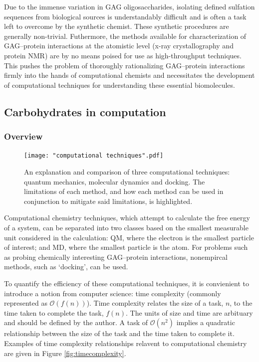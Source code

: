 \documentclass[journal=jctcce,manuscript=article]{achemso}
\begin{document}
{Due to the immense variation in \ac{GAG} oligosaccharides, isolating defined sulfation sequences from biological sources is understandably difficult and is often a task left to overcome by the synthetic chemist.  \cite{Gama2006SulfationActivity}
These synthetic procedures are generally non-trivial. \cite{Das2001SynthesisHeparin} 
Futhermore, the methods available for characterization of 
\ac{GAG}--protein interactions at the atomistic level (x-ray crystallography and protein NMR) are by no means poised for use as high-throughput techniques. This pushes the problem of thoroughly rationalizing \ac{GAG}--protein interactions firmly into the hands of computational chemists and necessitates the development of computational techniques for understanding these essential biomolecules. \cite{Woods2018PredictingComplexes}

%
%
%
%
%

\subsection{Carbohydrates in computation}
\subsubsection{Overview}

\begin{figure}[bl!]
    \centering
    \texttt{[image: "computational techniques".pdf]}
    \caption{An explanation and comparison of three computational techniques: quantum mechanics, molecular dynamics and docking. The limitations of each method, and how each method can be used in conjunction to mitigate said limitations, is highlighted.}
    \label{fig:comp}
\end{figure}

Computational chemistry techniques, which attempt to calculate the free energy of a system, can be separated into two classes based on the smallest measurable unit considered in the calculation: \ac{QM}, where the electron is the smallest particle of interest; and \acf{MD}, where the smallest particle is the atom. \cite{}
For problems such as probing chemically interesting \ac{GAG}--protein interactions, nonempircal methods, such as `docking', can be used.

To quantify the efficiency of these computational techniques, it is convienient to introduce a notion from computer science: time complexity (commonly represented as $\mathcal{O}(f(n))$). Time complexity relates the size of a task, $n$, to the time taken to complete the task, $f(n)$. The units of size and time are arbituary and should be defined by the author. A task of $\mathcal{O}(n^{2})$ implies a quadratic relationship between the size of the task and the time taken to complete it. Examples of time complexity relationships relavent to computational chemistry are given in Figure \ref{fig:timecomplexity}.

}
\end{document}
